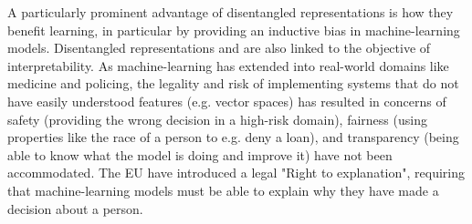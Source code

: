 A particularly prominent advantage of disentangled representations is how they benefit learning, in particular by providing an inductive bias in machine-learning models. Disentangled representations and are also linked to the objective of interpretability. As machine-learning has extended into  real-world domains like medicine and policing,  the legality and risk of implementing systems that do not have easily understood features (e.g. vector spaces) has resulted in concerns of safety (providing the wrong decision in a high-risk domain), fairness (using properties like  the race of a person to e.g. deny a loan), and transparency (being able to know what the model is doing and improve it) have not been accommodated. The EU have introduced a legal "Right to explanation", requiring that machine-learning models must be able to explain why they have made a decision about a person. 







